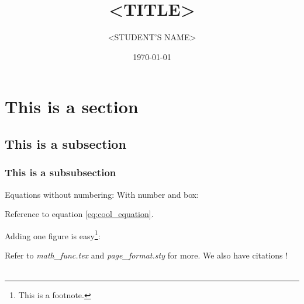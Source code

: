 \documentclass[12pt, a4paper, twoside]{article}
\title{<TITLE>} %
\author{<STUDENT'S NAME>} %
\date{\today} %
\begin{document}
\maketitlepage

\maketableofcontents

\section{This is a section}

\lipsum[1]

\subsection{This is a subsection}

\subsubsection{This is a subsubsection}
Equations without numbering:
With number and box:

Reference to equation \eqref{eq:cool_equation}.


Adding one figure is easy\footnote{This is a footnote.}:

Refer to \textit{math\_func.tex} and \textit{page\_format.sty} for more. We also have citations \cite{CitekeyBook}!
\\\\
\lipsum[1-6]

\makereferences

\blankpage

\end{document}

